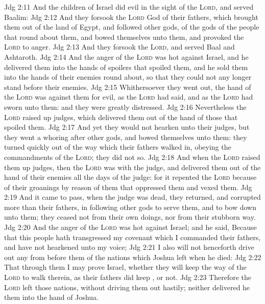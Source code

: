\vs Jdg 2:11 And the children of Israel did evil in the sight of the \textsc{Lord}, and served Baalim:
\vs Jdg 2:12 And they forsook the \textsc{Lord} God of their fathers, which brought them out of the land of Egypt, and followed other gods, of the gods of the people that  round about them, and bowed themselves unto them, and provoked the \textsc{Lord} to anger.
\vs Jdg 2:13 And they forsook the \textsc{Lord}, and served Baal and Ashtaroth.
\vs Jdg 2:14 And the anger of the \textsc{Lord} was hot against Israel, and he delivered them into the hands of spoilers that spoiled them, and he sold them into the hands of their enemies round about, so that they could not any longer stand before their enemies.
\vs Jdg 2:15 Whithersoever they went out, the hand of the \textsc{Lord} was against them for evil, as the \textsc{Lord} had said, and as the \textsc{Lord} had sworn unto them: and they were greatly distressed.
\vs Jdg 2:16 Nevertheless the \textsc{Lord} raised up judges, which delivered them out of the hand of those that spoiled them.
\vs Jdg 2:17 And yet they would not hearken unto their judges, but they went a whoring after other gods, and bowed themselves unto them: they turned quickly out of the way which their fathers walked in, obeying the commandments of the \textsc{Lord};  they did not so.
\vs Jdg 2:18 And when the \textsc{Lord} raised them up judges, then the \textsc{Lord} was with the judge, and delivered them out of the hand of their enemies all the days of the judge: for it repented the \textsc{Lord} because of their groanings by reason of them that oppressed them and vexed them.
\vs Jdg 2:19 And it came to pass, when the judge was dead,  they returned, and corrupted  more than their fathers, in following other gods to serve them, and to bow down unto them; they ceased not from their own doings, nor from their stubborn way.
\vs Jdg 2:20 And the anger of the \textsc{Lord} was hot against Israel; and he said, Because that this people hath transgressed my covenant which I commanded their fathers, and have not hearkened unto my voice;
\vs Jdg 2:21 I also will not henceforth drive out any from before them of the nations which Joshua left when he died:
\vs Jdg 2:22 That through them I may prove Israel, whether they will keep the way of the \textsc{Lord} to walk therein, as their fathers did keep , or not.
\vs Jdg 2:23 Therefore the \textsc{Lord} left those nations, without driving them out hastily; neither delivered he them into the hand of Joshua.
